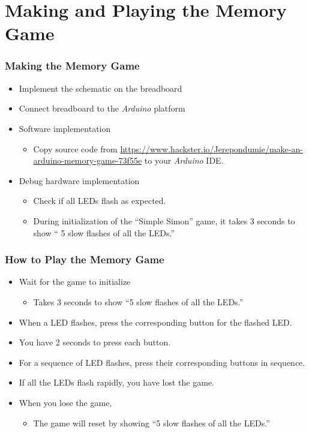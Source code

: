 \documentclass[xcolor={usenames,dvipsnames},hyperref={hyperindex,bookmarks}]{beamer}
\begin{document}
\section{Making and Playing the Memory Game}

\frame
{
	\frametitle{Making the Memory Game}

	\begin{itemize}
	\item Implement the schematic on the breadboard
	\item Connect breadboard to the {\it Arduino} platform
	\item Software implementation
		\begin{itemize}
		\item Copy source code from \url{https://www.hackster.io/Jerepondumie/make-an-arduino-memory-game-73f55e} to your {\it Arduino} IDE.
		\end{itemize}
	\item Debug hardware implementation
		\begin{itemize}
		\item Check if all LEDs flash as expected.
		\item During initialization of the ``Simple Simon'' game, it takes 3 seconds to show `` 5 slow flashes of all the LEDs.''
		\end{itemize}
	\end{itemize}
}



\frame
{
	\frametitle{How to Play the Memory Game}

	\begin{itemize}
	\item Wait for the game to initialize
		\begin{itemize}
		\item Takes 3 seconds to show ``5 slow flashes of all the LEDs.''
		\end{itemize}
	\item When a LED flashes, press the corresponding button for the flashed LED.
	\item You have 2 seconds to press each button.
	\item For a sequence of LED flashes, press their corresponding buttons in sequence.
	\item If all the LEDs flash rapidly, you have lost the game.
	\item When you lose the game,
		\begin{itemize}
		\item The game will reset by showing ``5 slow flashes of all the LEDs.''
		\end{itemize}
	\end{itemize}
}
\end{document}
